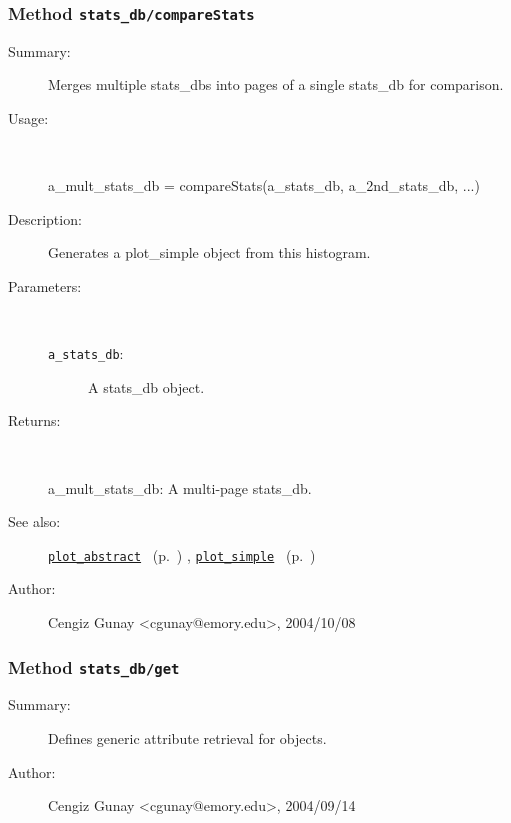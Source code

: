 \subsubsection[Method \texttt{compareStats}]{Method \texttt{stats\_db/compareStats}}%
%
\label{ref_stats_db__compareStats}%
\hypertarget{ref_stats_db__compareStats}{}%
\begin{description}
\item[Summary:]Merges multiple stats\_dbs into pages of a single stats\_db for comparison.
%
\item[Usage:]~%
\begin{lyxcode}%
a\_mult\_stats\_db = compareStats(a\_stats\_db, a\_2nd\_stats\_db, ...)
%
\end{lyxcode}%
%
\item[Description:]%
Generates a plot\_simple object from this histogram.
\item[Parameters:]~
\begin{description}%
\item[\texttt{a\_stats\_db}:]
 A stats\_db object.
\end{description}%
%
\item[Returns:
]~

	a\_mult\_stats\_db: A multi-page stats\_db.
%
%
\item[See also:]%
\hyperlink{ref_plot_abstract}{\texttt{plot\_abstract}}%
\ (p.~\pageref{ref_plot_abstract})%
%
, \hyperlink{ref_plot_simple}{\texttt{plot\_simple}}%
\ (p.~\pageref{ref_plot_simple})%
%
%
\item[Author:]%
Cengiz Gunay <cgunay@emory.edu>, 2004/10/08
%
\end{description}
\methodline%
\subsubsection[Method \texttt{get}]{Method \texttt{stats\_db/get}}%
%
\label{ref_stats_db__get}%
\hypertarget{ref_stats_db__get}{}%
\begin{description}
\item[Summary:]Defines generic attribute retrieval for objects.
%
%
%
%
%
%
%
\item[Author:]%
Cengiz Gunay <cgunay@emory.edu>, 2004/09/14
%
\end{description}
\methodline%
